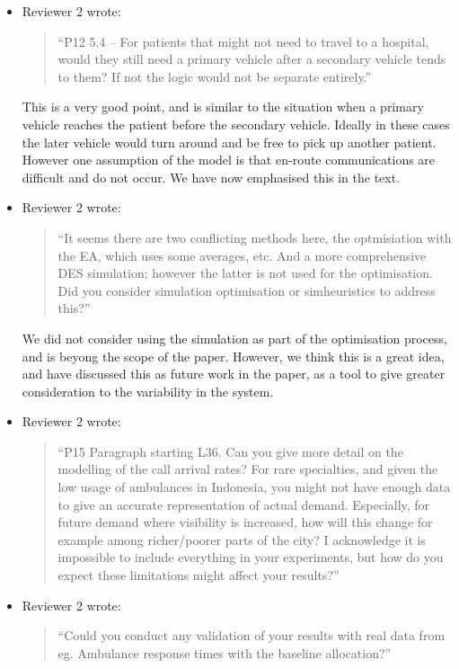 \documentclass{article}
\begin{document}
\begin{itemize}
\item Reviewer 2 wrote:
\begin{quote}
``P12 5.4 – For patients that might not need to travel to a hospital, would they still need a primary vehicle after a secondary vehicle tends to them? If not the logic would not be separate entirely.''
\end{quote}
This is a very good point, and is similar to the situation when a primary vehicle reaches the patient before the secondary vehicle. Ideally in these cases the later vehicle would turn around and be free to pick up another patient. However one assumption of the model is that en-route communications are difficult and do not occur. We have now emphasised this in the text.

\item Reviewer 2 wrote:
\begin{quote}
``It seems there are two conflicting methods here, the optmisiation with the EA, which uses some averages, etc. And a more comprehensive DES simulation; however the latter is not used for the optimisation. Did you consider simulation optimisation or simheuristics to address this?''
\end{quote}
We did not consider using the simulation as part of the optimisation process, and is beyong the scope of the paper. However, we think this is a great idea, and have discussed this as future work in the paper, as a tool to give greater consideration to the variability in the system.

\item Reviewer 2 wrote:
\begin{quote}
``P15 Paragraph starting L36. Can you give more detail on the modelling of the call arrival rates? For rare specialties, and given the low usage of ambulances in Indonesia, you might not have enough data to give an accurate representation of actual demand. Especially, for future demand where visibility is increased, how will this change for example among richer/poorer parts of the city? I acknowledge it is impossible to include everything in your experiments, but how do you expect these limitations might affect your results?''
\end{quote}

\item Reviewer 2 wrote:
\begin{quote}
``Could you conduct any validation of your results with real data from eg. Ambulance response times with the baseline allocation?''
\end{quote}


\end{itemize}
\end{document}
